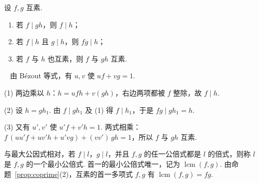 \documentclass[lang=cn,10.5pt,scheme=chinese,toc=twocol,section,chinesefont=nofont,
twoside,citestyle=gb7714-2015,bibstyle=gb7714-2015]{elegantbook}
\DeclareRobustCommand{\textbf}[1]{{\lnsemiboldlatin\lnsemiboldcjk #1}}
\numberwithin{equation}{section}   %
\newcommand*{\lnlabel}[1]{{\sffamily\bfseries\color{black}#1}}
\renewenvironment{proof}{%
	\par\noindent\lnlabel{\proofname}\;\ \color{black!90}\cfs}{\par}
\begin{document}
\begin{proposition}
  \label{prop:coprime}
  设 $f,g$ 互素.
  \begin{enumerate}
    \item 若 $f\mid gh$，则 $f\mid h$；
    \item 若 $f\mid h$ 且 $g\mid h$，则 $fg\mid h$；
    \item 若 $f$ 与 $h$ 也互素，则 $f$ 与 $gh$ 互素.
  \end{enumerate}
\end{proposition}
\begin{proof}
  由 Bézout 等式，有 $u,v$ 使 $uf+vg=1$.

  (1) 两边乘以 $h$：$h=ufh+v(gh)$，右边两项都被 $f$ 整除，故 $f\mid h$.

  (2) 设 $h=gh_1$. 由 $f\mid gh_1$ 及 (1) 得 $f\mid h_1$，于是 $fg\mid gh_1=h$.

  (3) 又有 $u',v'$ 使 $u'f+v'h=1$. 两式相乘：$f\,(uu'f+uv'h+u'vg)+(vv')\,gh=1$，所以 $f$ 与 $gh$ 互素.
\end{proof}

与最大公因式相对，若 $f\mid l$，$g\mid l$，并且 $f,g$ 的任一公倍式都是 $l$ 的倍式，则称 $l$ 是 $f,g$ 的一个\textbf{最小公倍式}. 首一的最小公倍式唯一，记为 $\operatorname{lcm}(f,g)$. 由命题~\ref{prop:coprime}(2)，互素的首一多项式 $f,g$ 有 $\operatorname{lcm}(f,g)=fg$.
\end{document}
